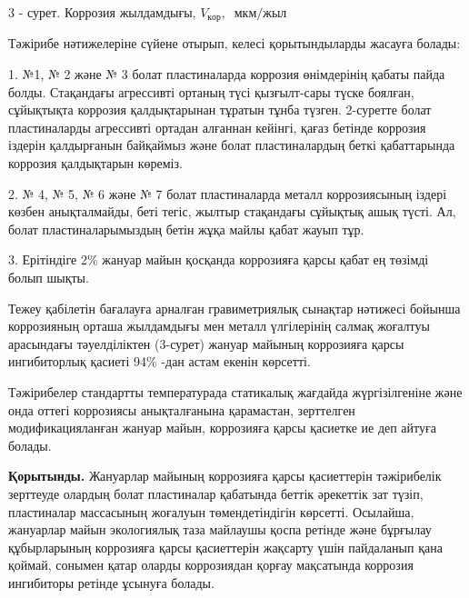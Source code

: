


3 - сурет. Коррозия жылдамдығы, \(V_{кор},\ \) \(мкм/жыл\)

Тәжірибе нәтижелеріне сүйене отырып, келесі қорытындыларды жасауға
болады:

1. №1, № 2 және № 3 болат пластиналарда коррозия өнімдерінің қабаты
пайда болды. Стақандағы агрессивті ортаның түсі қызғылт-сары түске
боялған, сұйықтықта коррозия қалдықтарынан тұратын тұнба түзген.
2-суретте болат пластиналарды агрессивті ортадан алғаннан кейінгі, қағаз
бетінде коррозия іздерін қалдырғанын байқаймыз және болат пластиналардың
беткі қабаттарында коррозия қалдықтарын көреміз.

2. № 4, № 5, № 6 және № 7 болат пластиналарда металл коррозиясының
іздері көзбен анықталмайды, беті тегіс, жылтыр стақандағы сұйықтық ашық
түсті. Ал, болат пластиналарымыздың бетін жұқа майлы қабат жауып тұр.

3. Ерітіндіге 2\% жануар майын қосқанда коррозияға қарсы қабат ең
төзімді болып шықты.

Тежеу қабілетін бағалауға арналған гравиметриялық сынақтар нәтижесі
бойынша коррозияның орташа жылдамдығы мен металл үлгілерінің салмақ
жоғалтуы арасындағы тәуелділіктен (3-сурет) жануар майының коррозияға
қарсы ингибиторлық қасиеті 94\% -дан астам екенін көрсетті.

Тәжірибелер стандартты температурада статикалық жағдайда жүргізілгеніне
және онда оттегі коррозиясы анықталғанына қарамастан, зерттелген
модификацияланған жануар майын, коррозияға қарсы қасиетке ие деп айтуға
болады.

{\bfseries Қорытынды.} Жануарлар майының коррозияға қарсы қасиеттерін
тәжірибелік зерттеуде олардың болат пластиналар қабатында беттік
әрекеттік зат түзіп, пластиналар массасының жоғалуын төмендетіндігін
көрсетті. Осылайша, жануарлар майын экологиялық таза майлаушы қоспа
ретінде және бұрғылау құбырларының коррозияға қарсы қасиеттерін жақсарту
үшін пайдаланып қана қоймай, сонымен қатар оларды коррозиядан қорғау
мақсатында коррозия ингибиторы ретінде ұсынуға болады.


